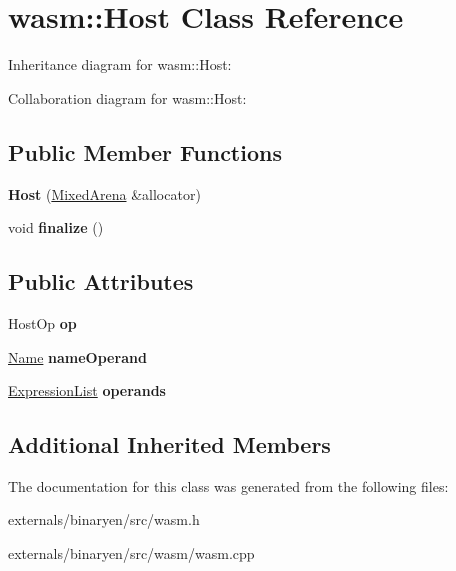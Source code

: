 \hypertarget{classwasm_1_1_host}{}\section{wasm\+:\+:Host Class Reference}
\label{classwasm_1_1_host}


Inheritance diagram for wasm\+:\+:Host\+:


Collaboration diagram for wasm\+:\+:Host\+:
\subsection*{Public Member Functions}
\begin{DoxyCompactItemize}
\item 
\mbox{\label{classwasm_1_1_host_a7975436bb4b3141dab901a49a7465182}} 
{\bfseries Host} (\mbox{\hyperlink{struct_mixed_arena}{Mixed\+Arena}} \&allocator)
\item 
\mbox{\label{classwasm_1_1_host_a6475cd15506a4df998806b7c605ac1e5}} 
void {\bfseries finalize} ()
\end{DoxyCompactItemize}
\subsection*{Public Attributes}
\begin{DoxyCompactItemize}
\item 
\mbox{\label{classwasm_1_1_host_a75933812d372eb157ad9eebad631933f}} 
Host\+Op {\bfseries op}
\item 
\mbox{\label{classwasm_1_1_host_ade9b12ac400a069c8c423831f42917e3}} 
\mbox{\hyperlink{structwasm_1_1_name}{Name}} {\bfseries name\+Operand}
\item 
\mbox{\label{classwasm_1_1_host_a3109cd154c19d1920d5264a6dda7aebe}} 
\mbox{\hyperlink{class_arena_vector}{Expression\+List}} {\bfseries operands}
\end{DoxyCompactItemize}
\subsection*{Additional Inherited Members}


The documentation for this class was generated from the following files\+:\begin{DoxyCompactItemize}
\item 
externals/binaryen/src/wasm.\+h\item 
externals/binaryen/src/wasm/wasm.\+cpp\end{DoxyCompactItemize}
